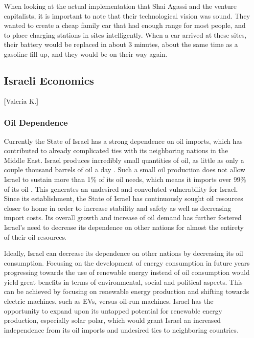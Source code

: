 \documentclass{article}                         %
\begin{document}
When looking at the actual implementation that Shai Agassi and the venture capitalists, it is important to note that their technological vision was sound. They wanted to create a cheap family car that had enough range for most people, and to place charging stations in sites intelligently. When a car arrived at these sites, their battery would be replaced in about 3 minutes, about the same time as a gasoline fill up, and they would be on their way again. 

\subsection{Israeli Economics}[Valeria K.]
\subsubsection{Oil Dependence}
Currently the State of Israel has a strong dependence on oil imports, which has contributed to already complicated ties with its neighboring nations in the Middle East. Israel produces incredibly small quantities of oil, as little as only a couple thousand barrels of oil a day \cite{Engber2006WhereOil}. Such a small oil production does not allow Israel to sustain more than 1\% of its oil needs, which means it imports over 99\% of its oil \cite{Engber2006WhereOil}. This generates an undesired and convoluted vulnerability for Israel. Since its establishment, the State of Israel has continuously sought oil resources closer to home in order to increase stability and safety as well as decreasing import costs. Its overall growth and increase of oil demand has further fostered Israel's need to decrease its dependence on other nations for almost the entirety of their oil resources. 

Ideally, Israel can decrease its dependence on other nations by decreasing its oil consumption. Focusing on the development of energy consumption in future years progressing towards the use of renewable energy instead of oil consumption would yield great benefits in terms of environmental, social and political aspects. This can be achieved by focusing on renewable energy production and shifting towards electric machines, such as EVs, versus oil-run machines. Israel has the opportunity to expand upon its untapped potential for renewable energy production, especially solar polar, which would grant Israel an increased independence from its oil imports and undesired ties to neighboring countries.
\end{document}
